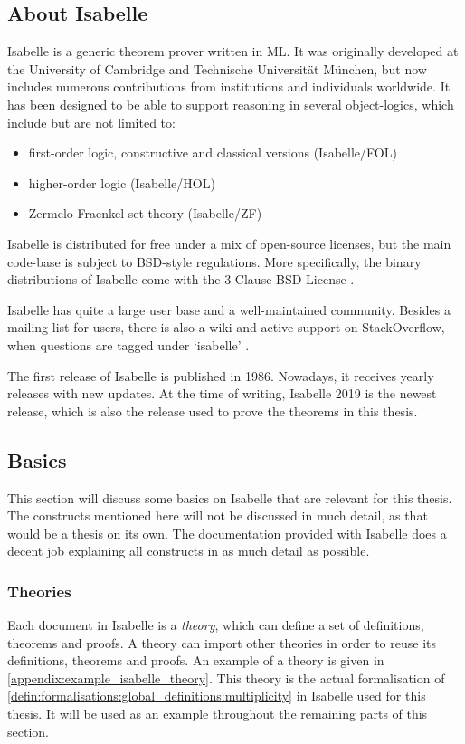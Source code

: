 \subsection{About Isabelle}
\label{subsec:background:theorem_proving_using_isabelle:about_isabelle}
Isabelle \cite{isabelle_2019} is a generic theorem prover written in \textsc{ML}. It was originally developed at the University of Cambridge and Technische Universität München, but now includes numerous contributions from institutions and individuals worldwide. It has been designed to be able to support reasoning in several object-logics, which include but are not limited to:
\begin{itemize}
    \item first-order logic, constructive and classical versions (Isabelle/FOL)
    \item higher-order logic (Isabelle/HOL)
    \item Zermelo-Fraenkel set theory (Isabelle/ZF)
\end{itemize}
Isabelle is distributed for free under a mix of open-source licenses, but the main code-base is subject to BSD-style regulations. More specifically, the binary distributions of Isabelle come with the 3-Clause BSD License \cite{bsd3clause}.

Isabelle has quite a large user base and a well-maintained community. Besides a mailing list for users, there is also a wiki \cite{isabelle_wiki} and active support on StackOverflow, when questions are tagged under `isabelle' \cite{isabelle_stack_overflow}.

The first release of Isabelle is published in 1986. Nowadays, it receives yearly releases with new updates. At the time of writing, Isabelle 2019 is the newest release, which is also the release used to prove the theorems in this thesis.

\subsection{Basics}
\label{subsec:background:theorem_proving_using_isabelle:basics}
This section will discuss some basics on Isabelle that are relevant for this thesis. The constructs mentioned here will not be discussed in much detail, as that would be a thesis on its own. The documentation provided with Isabelle does a decent job explaining all constructs in as much detail as possible.

\subsubsection{Theories}
Each document in Isabelle is a \textit{theory}, which can define a set of definitions, theorems and proofs. A theory can import other theories in order to reuse its definitions, theorems and proofs. An example of a theory is given in \cref{appendix:example_isabelle_theory}. This theory is the actual formalisation of \cref{defin:formalisations:global_definitions:multiplicity} in Isabelle used for this thesis. It will be used as an example throughout the remaining parts of this section.

